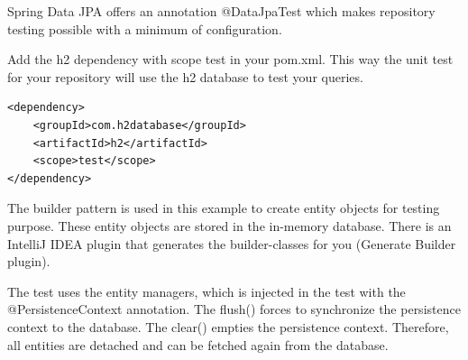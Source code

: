 Spring Data JPA offers an annotation @DataJpaTest which makes repository testing possible with a minimum of configuration. 

Add the h2 dependency with scope test in your pom.xml. This way the unit test for your repository will use the h2 database to test your queries.

\begin{lstlisting}
<dependency>
	<groupId>com.h2database</groupId>
	<artifactId>h2</artifactId>
	<scope>test</scope>
</dependency>
\end{lstlisting}

The builder pattern is used in this example to create entity objects for testing purpose. These entity objects are stored in the in-memory database. There is an IntelliJ IDEA plugin that generates the builder-classes for you (Generate Builder plugin).

The test uses the entity managers, which is injected in the test with the @PersistenceContext annotation. The flush() forces to synchronize the persistence context to the database. The clear() empties the persistence context. Therefore, all entities are detached and can be fetched again from the database.

